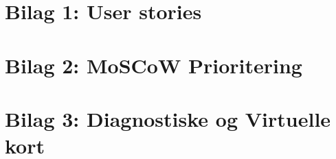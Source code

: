 \section{Bilag 1: User stories}

\newpage
\section{Bilag 2: MoSCoW Prioritering}

\section{Bilag 3: Diagnostiske og Virtuelle kort}

